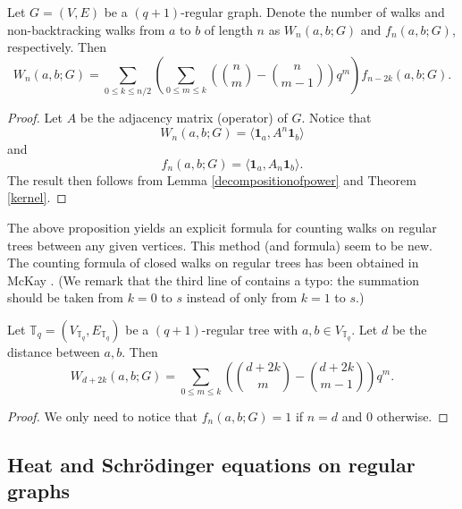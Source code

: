 \documentclass{article}
\begin{document}
\begin{proposition}\label{numberofwalkonrg}
    Let $G=(V,E)$ be a $(q+1)$-regular graph. Denote the number of walks and non-backtracking walks from $a$ to $b$ of length $n$ as $W_n(a,b;G)$ and $f_n(a,b;G)$, respectively. Then 
    \begin{equation*}
        W_n(a,b;G)=\sum_{0\leq k\leq n/2} \left(\sum_{0\leq m\leq k}
        \left(\binom{n}{m}-\binom{n}{m-1}\right)q^{m}\right)f_{n-2k}(a,b;G).
    \end{equation*}
\end{proposition}

\begin{proof}
    Let $A$ be the adjacency matrix (operator) of $G$. Notice that 
    \[W_n(a,b;G)=\langle \mathbf{1}_{a}, A^n \mathbf{1}_{b} \rangle\] 
    and 
    \[f_n(a,b;G)=\langle \mathbf{1}_{a}, A_n \mathbf{1}_{b} \rangle.\]
    The result then follows from Lemma \ref{decompositionofpower}
    and Theorem \ref{kernel}. 
\end{proof}

The above proposition yields an explicit formula for counting walks on regular trees between any given vertices. This method (and formula) seem to be new. The counting formula of closed walks on regular trees has been obtained in McKay \cite[Lemma 2.1]{McK81}. (We remark that the third line of \cite[Lemma 2.1]{McK81} contains a typo: the summation should be taken from $k=0$ to $s$ instead of only from $k=1$ to $s$.)

\begin{corollary}\label{numberofwalktree}
    Let $\mathbb{T}_q=(V_{\mathbb{T}_q},E_{\mathbb{T}_q})$ be a $(q+1)$-regular tree with $a,b\in V_{\mathbb{T}_q}$. Let $d$ be the distance between $a,b$. Then 
    \begin{equation}
        W_{d+2k}(a,b;G)=\sum_{0\leq m\leq k}
        \left(\binom{d+2k}{m}-\binom{d+2k}{m-1}\right)q^{m}.
    \end{equation}
\end{corollary}
\begin{proof}
    We only need to notice that $f_{n}(a,b; G)=1$ if $n=d$ and $0$ otherwise.
\end{proof}



\subsection{Heat and Schr\"odinger equations on regular graphs}
\end{document}
